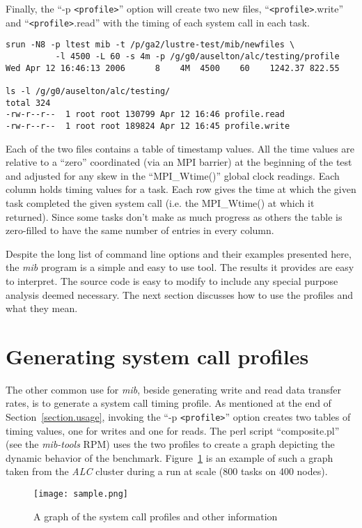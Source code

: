 \documentclass{article}
\begin{document}
Finally, the ``-p \verb+<profile>+'' option will create two new files,
``\verb+<profile>+.write'' and ``\verb+<profile>+.read'' with the timing of each
system call in each task.  
\begin{verbatim}
srun -N8 -p ltest mib -t /p/ga2/lustre-test/mib/newfiles \
          -l 4500 -L 60 -s 4m -p /g/g0/auselton/alc/testing/profile
Wed Apr 12 16:46:13 2006      8    4M  4500    60    1242.37 822.55

ls -l /g/g0/auselton/alc/testing/       
total 324
-rw-r--r--  1 root root 130799 Apr 12 16:46 profile.read
-rw-r--r--  1 root root 189824 Apr 12 16:45 profile.write
\end{verbatim}
Each of the two files contains a table of timestamp values.  All the
time values are relative to a ``zero'' coordinated (via an MPI
barrier) at the beginning of the test and adjusted for any skew in the
``MPI\_Wtime()'' global clock readings.  Each column holds timing
values for a task.  Each row gives the time at which the given task
completed the given system call (i.e. the MPI\_Wtime() at which it
returned).  Since some tasks don't make as much progress as others the
table is zero-filled to have the same number of entries in every
column.

Despite the long list of command line options and their examples
presented here, the {\em mib} program is a simple and easy to use
tool.  The results it provides are easy to interpret.  The source code
is easy to modify to include any special purpose analysis deemed
necessary.  The next section discusses how to use the profiles and
what they mean.

\section{Generating system call profiles}\label{section.profiles}

The other common use for {\em mib}, beside generating write and read
data transfer rates, is to generate a system call timing profile.  As
mentioned at the end of Section~\ref{section.usage}, invoking the
``-p \verb+<profile>+'' option creates two tables of timing values,
one for writes and one for reads.  The perl script ``composite.pl''
(see the {\em mib-tools} RPM) uses the two profiles to create a graph
depicting the dynamic behavior of the benchmark.
Figure~\ref{composite.fig} is an example of such a graph taken from
the {\em ALC} cluster during a run at scale (800 tasks on 400 nodes).

\begin{figure}
  \texttt{[image: sample.png]}
\caption{A graph of the system call profiles and other information}
\label{composite.fig}
\end{figure}
\end{document}
